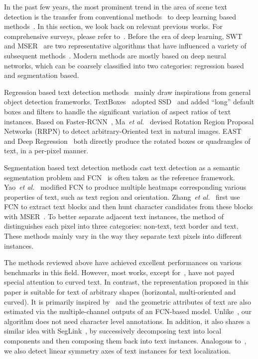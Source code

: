 \documentclass[runningheads]{llncs}
\begin{document}
In the past few years, the most prominent trend in the area of scene text detection is the transfer from conventional methods~\cite{epshtein2010detecting,neumann2010method} to deep learning based methods~\cite{jaderberg2014deep,jaderberg2016reading,liao2017textboxes,Zhou_2017_CVPR,Shi_2017_CVPR}. In this section, we look back on relevant previous works. For comprehensive surveys, please refer to~\cite{ye2015text,zhu2016scene}.  Before the era of deep learning, SWT~\cite{epshtein2010detecting} and MSER~\cite{neumann2010method} are two representative algorithms that have influenced a variety of subsequent methods~\cite{yin2014robust,huang2014robust}. Modern methods are mostly based on deep neural networks, which can be coarsely classified into two categories: regression based and segmentation based.

Regression based text detection methods~\cite{liao2017textboxes} mainly draw inspirations from general object detection frameworks. TextBoxes~\cite{liao2017textboxes} adopted SSD~\cite{liu2016ssd} and added ``long'' default boxes and filters to handle the significant variation of aspect ratios of text instances. Based on Faster-RCNN~\cite{ren2015faster}, Ma~\textit{et al.}~\cite{ma2017arbitrary} devised Rotation Region Proposal Networks (RRPN) to detect arbitrary-Oriented text in natural images. EAST~\cite{Zhou_2017_CVPR} and Deep Regression~\cite{He_2017_ICCV} both directly produce the rotated boxes or quadrangles of text, in a per-pixel manner.

Segmentation based text detection methods cast text detection as a semantic segmentation problem and FCN~\cite{long2015fully} is often taken as the reference framework. Yao~\textit{et al.}~\cite{yao2016scene} modified FCN to produce multiple heatmaps corresponding various properties of text, such as text region and orientation. Zhang~\textit{et al.}~\cite{zhang2016multi} first use FCN to extract text blocks and then hunt character candidates from these blocks with MSER~\cite{neumann2010method}.  To better separate adjacent text instances, the method of~\cite{wu2017self} distinguishes each pixel into three categories: non-text, text border and text. These methods mainly vary in the way they separate text pixels into different instances.

The methods reviewed above have achieved excellent performances on various benchmarks in this field. However, most works, except for~\cite{yao2016scene,he2017multi,kheng2017total}, have not payed special attention to curved text. In contrast, the representation proposed in this paper is suitable for text of arbitrary shapes (horizontal, multi-oriented and curved). It is primarily inspired by~\cite{yao2016scene,he2017multi} and the geometric attributes of text are also estimated via the multiple-channel outputs  of an FCN-based model. Unlike~\cite{yao2016scene}, our algorithm does not need character level annotations. In addition, it also shares a similar idea with SegLink~\cite{Shi_2017_CVPR}, by successively decomposing text into local components and then composing them back into text instances. Analogous to~\cite{zhang2015symmetry}, we also detect linear symmetry axes of text instances for text localization.
\end{document}
